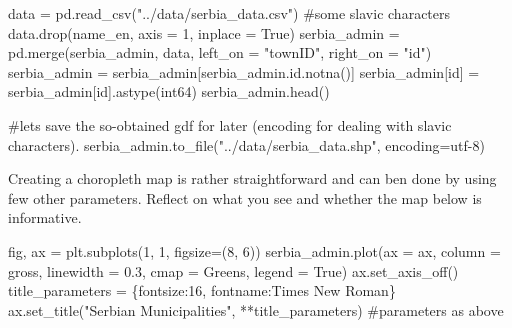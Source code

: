 \documentclass[
  letterpaper,
  DIV=11,
  numbers=noendperiod]{scrreprt}
\newenvironment{Shaded}{\begin{snugshade}}{\end{snugshade}}
\newcommand{\BuiltInTok}[1]{\textcolor[rgb]{0.00,0.23,0.31}{#1}}
\newcommand{\CommentTok}[1]{\textcolor[rgb]{0.37,0.37,0.37}{#1}}
\newcommand{\DecValTok}[1]{\textcolor[rgb]{0.68,0.00,0.00}{#1}}
\newcommand{\FloatTok}[1]{\textcolor[rgb]{0.68,0.00,0.00}{#1}}
\newcommand{\NormalTok}[1]{\textcolor[rgb]{0.00,0.23,0.31}{#1}}
\newcommand{\OperatorTok}[1]{\textcolor[rgb]{0.37,0.37,0.37}{#1}}
\newcommand{\StringTok}[1]{\textcolor[rgb]{0.13,0.47,0.30}{#1}}
\newcommand{\VariableTok}[1]{\textcolor[rgb]{0.07,0.07,0.07}{#1}}
\begin{document}
\begin{Shaded}
\begin{Highlighting}[]
\NormalTok{data }\OperatorTok{=}\NormalTok{ pd.read\_csv(}\StringTok{"../data/serbia\_data.csv"}\NormalTok{) }\CommentTok{\#some slavic characters }
\NormalTok{data.drop(}\StringTok{\textquotesingle{}name\_en\textquotesingle{}}\NormalTok{, axis }\OperatorTok{=} \DecValTok{1}\NormalTok{, inplace }\OperatorTok{=} \VariableTok{True}\NormalTok{)}
\NormalTok{serbia\_admin }\OperatorTok{=}\NormalTok{ pd.merge(serbia\_admin, data, left\_on }\OperatorTok{=} \StringTok{"townID"}\NormalTok{, right\_on }\OperatorTok{=} \StringTok{"id"}\NormalTok{)}
\NormalTok{serbia\_admin }\OperatorTok{=}\NormalTok{ serbia\_admin[serbia\_admin.}\BuiltInTok{id}\NormalTok{.notna()]}
\NormalTok{serbia\_admin[}\StringTok{\textquotesingle{}id\textquotesingle{}}\NormalTok{] }\OperatorTok{=}\NormalTok{ serbia\_admin[}\StringTok{\textquotesingle{}id\textquotesingle{}}\NormalTok{].astype(}\StringTok{\textquotesingle{}int64\textquotesingle{}}\NormalTok{)}
\NormalTok{serbia\_admin.head()}

\CommentTok{\#let\textquotesingle{}s save the so{-}obtained gdf for later (encoding for dealing with slavic characters).}
\NormalTok{serbia\_admin.to\_file(}\StringTok{"../data/serbia\_data.shp"}\NormalTok{, encoding}\OperatorTok{=}\StringTok{\textquotesingle{}utf{-}8\textquotesingle{}}\NormalTok{)}
\end{Highlighting}
\end{Shaded}

Creating a choropleth map is rather straightforward and can ben done by
using few other parameters. Reflect on what you see and whether the map
below is informative.

\begin{Shaded}
\begin{Highlighting}[]
\NormalTok{fig, ax }\OperatorTok{=}\NormalTok{ plt.subplots(}\DecValTok{1}\NormalTok{, }\DecValTok{1}\NormalTok{, figsize}\OperatorTok{=}\NormalTok{(}\DecValTok{8}\NormalTok{, }\DecValTok{6}\NormalTok{))}
\NormalTok{serbia\_admin.plot(ax }\OperatorTok{=}\NormalTok{ ax, column }\OperatorTok{=} \StringTok{\textquotesingle{}gross\textquotesingle{}}\NormalTok{, linewidth }\OperatorTok{=} \FloatTok{0.3}\NormalTok{, cmap }\OperatorTok{=} \StringTok{\textquotesingle{}Greens\textquotesingle{}}\NormalTok{, legend }\OperatorTok{=} \VariableTok{True}\NormalTok{)}
\NormalTok{ax.set\_axis\_off()}
\NormalTok{title\_parameters }\OperatorTok{=}\NormalTok{ \{}\StringTok{\textquotesingle{}fontsize\textquotesingle{}}\NormalTok{:}\StringTok{\textquotesingle{}16\textquotesingle{}}\NormalTok{, }\StringTok{\textquotesingle{}fontname\textquotesingle{}}\NormalTok{:}\StringTok{\textquotesingle{}Times New Roman\textquotesingle{}}\NormalTok{\}}
\NormalTok{ax.set\_title(}\StringTok{"Serbian Municipalities"}\NormalTok{, }\OperatorTok{**}\NormalTok{title\_parameters) }\CommentTok{\#parameters as above}
\end{Highlighting}
\end{Shaded}
\end{document}

